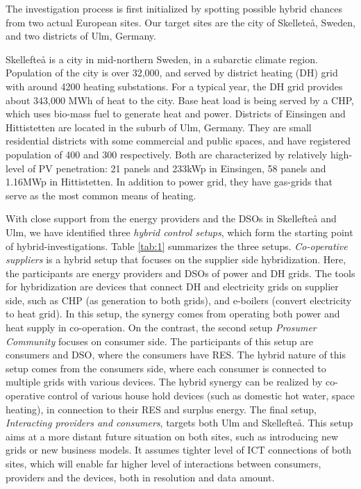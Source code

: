 \documentclass[a4paper,twoside]{article}
\begin{document}
\noindent
The investigation process is first initialized by spotting possible
hybrid chances from two actual European sites. 
Our target sites are the city of Skellete\aa , Sweden, and two
districts of Ulm, Germany.  

Skellefte{\aa}  is a city in mid-northern Sweden, in a subarctic
climate region. Population of the city is over 32,000, and served by
district heating (DH) grid with around 4200 heating substations. For a 
typical year, the DH grid provides about 343,000 MWh of heat to the 
city. Base heat load is being served by a CHP, which uses bio-mass
fuel to generate heat and power. 
Districts of Einsingen and Hittistetten are located in the suburb of
Ulm, Germany. They are small residential districts with some
commercial and  public spaces, and have registered population of 400
and 300 respectively. Both are characterized by relatively high-level
of PV penetration: 21 panels and 233kWp in Einsingen, 58 panels and 
1.16MWp in Hittistetten. In addition to power grid, they have
gas-grids that serve as the most common means of heating.  

With close support from the energy providers and the DSOs 
in Skellefte{\aa} and Ulm, we have identified three {\em hybrid
  control setups}, which form the starting point of
hybrid-investigations.    
Table \ref{tab:1} summarizes the three setups. {\em Co-operative
  suppliers} is a hybrid setup that focuses on the supplier side
hybridization. Here, the participants are energy providers and DSOs of  
power and DH grids. The tools for hybridization are devices that
connect DH and electricity grids on supplier side,
such as CHP (as generation to both grids), and e-boilers (convert
electricity to heat grid). In this setup, the synergy comes from
operating both power and heat supply in co-operation. 
On the contrast, the second setup {\em Prosumer Community} focuses on
consumer side. The participants of this setup are consumers and DSO,
where the consumers have RES. The hybrid nature of this setup comes
from the consumers side, where each consumer is connected to multiple
grids with various devices. The hybrid synergy can be realized by
co-operative control of various house hold devices (such as domestic
hot water, space heating), in connection to their RES and surplus
energy. 
The final setup, {\em Interacting providers and consumers}, targets
both Ulm and Skellefte{\aa}. This setup aims at a more distant future
situation on both sites, such as introducing new grids or new business
models. It assumes tighter level of ICT connections of both sites,
which will enable far higher level of interactions between consumers,
providers and the devices, both in resolution and data amount.   
\end{document}
